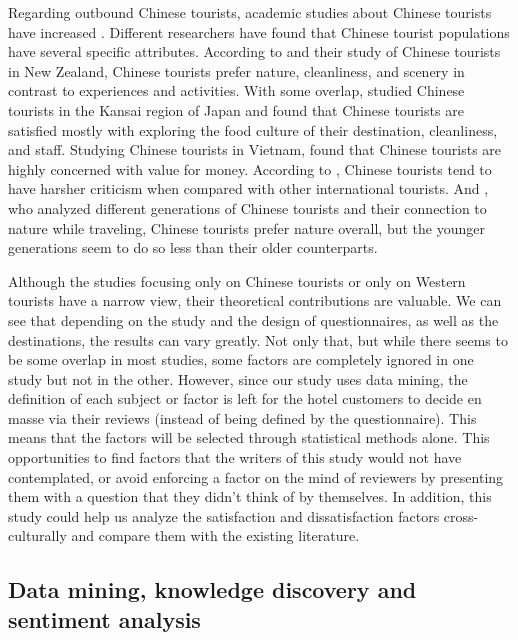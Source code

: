 Regarding outbound Chinese tourists, academic studies about Chinese tourists have increased \cite[][]{sun2017}. Different researchers have found that Chinese tourist populations have several specific attributes. According to \cite{ryan2001} and their study of Chinese tourists in New Zealand, Chinese tourists prefer nature, cleanliness, and scenery in contrast to experiences and activities. With some overlap, \cite{dongyang2015} studied Chinese tourists in the Kansai region of Japan and found that Chinese tourists are satisfied mostly with exploring the food culture of their destination, cleanliness, and staff. Studying Chinese tourists in Vietnam, \cite{truong2009} found that Chinese tourists are highly concerned with value for money. According to \cite{liu2019}, Chinese tourists tend to have harsher criticism when compared with other international tourists. And \DIFdelbegin {}\DIFdelend \DIFaddbegin {}\DIFaddend \cite{gao2017chinese}, who analyzed different generations of Chinese tourists and their connection to nature while traveling, Chinese tourists prefer nature overall, but the younger generations seem to do so less than their older counterparts. 

Although the studies focusing only on Chinese tourists or only on Western tourists have a narrow view, their theoretical contributions are valuable. We can see that depending on the study and the design of questionnaires, as well as the destinations, the results can vary greatly. Not only that, but while there seems to be some overlap in most studies, some factors are completely ignored in one study but not in the other. However, since our study uses data mining, the definition of each subject or factor is left for the hotel customers to decide en masse via their reviews (instead of being defined by the questionnaire). This means that the factors will be selected through statistical methods alone. This \DIFdelbegin {}\DIFdelend \DIFaddbegin {}\DIFaddend opportunities to find factors that the writers of this study would not have contemplated, or avoid enforcing a factor on the mind of reviewers by presenting them with a question that they didn't think of by themselves. In addition, this study could help us analyze the satisfaction and dissatisfaction factors cross-culturally and compare them with the existing literature.

\subsection{Data mining, knowledge discovery and sentiment analysis}\label{theory_data}

